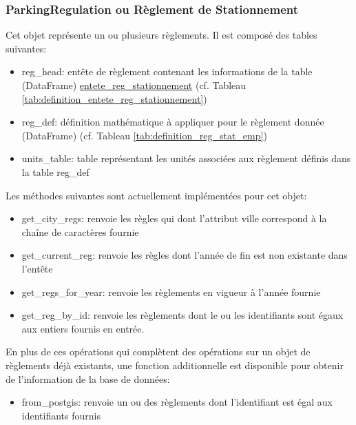         \subsubsection{ParkingRegulation ou Règlement de Stationnement} Cet objet représente un ou plusieurs règlements. Il est composé des tables suivantes:
        \begin{itemize}
            \item reg\_head: entête de règlement contenant les informations de la table (DataFrame) \underline{entete\_reg\_stationnement} (cf. Tableau \ref{tab:definition_entete_reg_stationnement})
            \item reg\_def: définition mathématique à appliquer pour le règlement donnée (DataFrame) (cf. Tableau \ref{tab:definition_reg_stat_emp})
            \item units\_table: table représentant les unités associées aux règlement définis dans la table reg\_def  
        \end{itemize}
        Les méthodes suivantes sont actuellement implémentées pour cet objet:
        \begin{itemize}
            \item get\_city\_regs: renvoie les règles qui dont l'attribut ville correspond à la chaîne de caractères fournie
            \item get\_current\_reg: renvoie les règles dont l'année de fin est non existante dans l'entête
            \item get\_regs\_for\_year: renvoie les règlements en vigueur à l'année fournie
            \item get\_reg\_by\_id: renvoie les règlements dont le ou les identifiants sont égaux aux entiers fournis en entrée.
        \end{itemize}
        En plus de ces opérations qui complètent des opérations sur un objet de règlements déjà existants, une fonction additionnelle est disponible pour obtenir de l'information de la base de données:
        \begin{itemize}
            \item from\_postgis: renvoie un ou des règlements dont l'identifiant est égal aux identifiants fournis
        \end{itemize}
        

